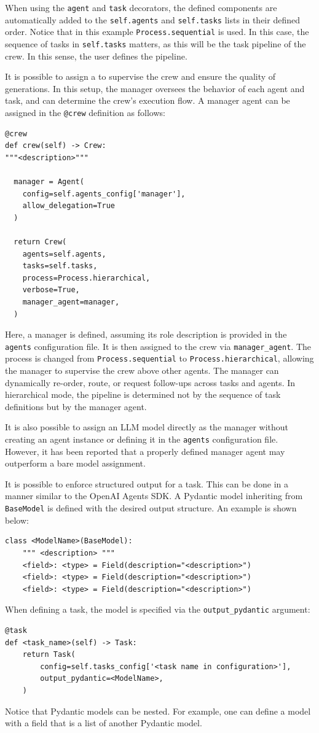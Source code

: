 When using the \verb|agent| and \verb|task| decorators, the defined components are automatically added to the \verb|self.agents| and \verb|self.tasks| lists in their defined order. Notice that in this example \verb|Process.sequential| is used. In this case, the sequence of tasks in \verb|self.tasks| matters, as this will be the task pipeline of the crew. In this sense, the user defines the pipeline.

It is possible to assign a  to supervise the crew and ensure the quality of generations. In this setup, the manager oversees the behavior of each agent and task, and can determine the crew’s execution flow. A manager agent can be assigned in the \verb|@crew| definition as follows:
\begin{lstlisting}
@crew
def crew(self) -> Crew:
"""<description>"""
  
  manager = Agent(
    config=self.agents_config['manager'],
    allow_delegation=True
  )
  
  return Crew(
    agents=self.agents,
    tasks=self.tasks,
    process=Process.hierarchical,
    verbose=True,
    manager_agent=manager,
  )
\end{lstlisting}

Here, a manager is defined, assuming its role description is provided in the \verb|agents| configuration file. It is then assigned to the crew via \verb|manager_agent|. The process is changed from \verb|Process.sequential| to \verb|Process.hierarchical|, allowing the manager to supervise the crew above other agents. The manager can dynamically re-order, route, or request follow-ups across tasks and agents. In hierarchical mode, the pipeline is determined not by the sequence of task definitions but by the manager agent.

It is also possible to assign an LLM model directly as the manager without creating an agent instance or defining it in the \verb|agents| configuration file. However, it has been reported that a properly defined manager agent may outperform a bare model assignment.

It is possible to enforce structured output for a task. This can be done in a manner similar to the OpenAI Agents SDK. A Pydantic model inheriting from \verb|BaseModel| is defined with the desired output structure. An example is shown below:
\begin{lstlisting}
class <ModelName>(BaseModel):
    """ <description> """
    <field>: <type> = Field(description="<description>")
    <field>: <type> = Field(description="<description>")
    <field>: <type> = Field(description="<description>")
\end{lstlisting}
When defining a task, the model is specified via the \verb|output_pydantic| argument:
\begin{lstlisting}
@task
def <task_name>(self) -> Task:
    return Task(
        config=self.tasks_config['<task name in configuration>'],
        output_pydantic=<ModelName>,
    )
\end{lstlisting}
Notice that Pydantic models can be nested. For example, one can define a model with a field that is a list of another Pydantic model.

